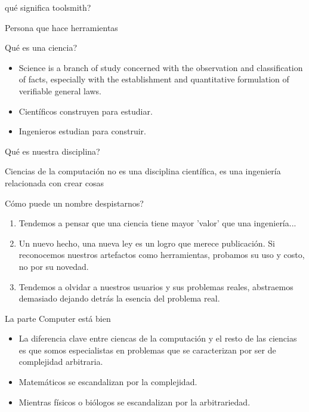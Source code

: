 \documentclass{beamer}
\begin{document}
\begin{frame}{qué significa toolsmith?}
\begin{center}
Persona que hace herramientas
\end{center}
\end{frame}

\begin{frame}{Qué es una ciencia?}
\begin{itemize}
\item Science is a branch of study concerned with the observation and 
classification of facts, especially with the establishment and 
quantitative formulation of verifiable general laws.
\item Científicos construyen para estudiar.
\item Ingenieros estudian para construir.
\end{itemize}
\end{frame}

\begin{frame}{Qué es nuestra disciplina?}
\begin{center}
Ciencias de la computación no es una disciplina científica, 
\newline
es una ingeniería relacionada con crear cosas
\end{center}
\end{frame}

\begin{frame}{Cómo puede un nombre despistarnos?}
\begin{center}
\begin{enumerate}
\item Tendemos a pensar que una ciencia tiene mayor 'valor'
que una ingeniería...
\item Un nuevo hecho, una nueva ley es un logro que
merece publicación.
Si reconocemos nuestros artefactos como herramientas, 
probamos su uso y costo, no por su novedad.
\item Tendemos a olvidar a nuestros usuarios y sus problemas reales,
abstraemos demasiado dejando detrás la esencia del problema real.
\end{enumerate}
\end{center}
\end{frame}

\begin{frame}{La parte Computer está bien}
\begin{itemize}
\item[] La diferencia clave entre ciencas de la computación
y el resto de las ciencias es que somos especialistas en problemas 
que se caracterizan por ser de complejidad arbitraria.
\item[] Matemáticos se escandalizan por la complejidad. 
\item[] Mientras físicos o biólogos se escandalizan por 
la arbitrariedad.
\end{itemize}
\end{frame}
\end{document}
